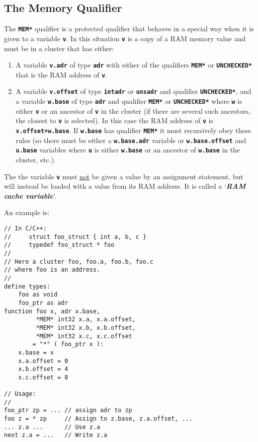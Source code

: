 \documentclass[12pt]{article}
\makeatletter
\newcommand{\TT}[1]{{\tt \bfseries #1}}
\newcommand{\key}[1]{{\bf \em #1}\index{#1}}
\newcommand{\ttkey}[1]{\TT{#1}\index{#1@{\tt #1}}}
\newenvironment{indpar}[1][0.3in]%
	{\begin{list}{}%
		     {\setlength{\itemsep}{0in}%
		      \setlength{\topsep}{0in}%
		      \setlength{\parsep}{1ex}%
		      \setlength{\labelwidth}{#1}%
		      \setlength{\leftmargin}{#1}%
		      \addtolength{\leftmargin}{\labelsep}}%
	 \item}%
	{\end{list}}
\makeatother
\begin{document}
\subsection{The Memory Qualifier}
\label{THE-MEM-QUALIFIER}

The \ttkey{*MEM*} qualifier is a protected qualifier that behaves
in a special way when it is given to a variable \TT{v}.
In this situation \TT{v} is a copy of a RAM memory value and
must be in a cluster that
has either:
\begin{enumerate}
\item
A variable \TT{v.adr} of type \TT{adr} with either of the qualifiers
\TT{*MEM*} or \TT{*UNCHECKED*} that is the RAM address of \TT{v}.

\item
A variable \TT{v.offset} of type \TT{intadr} or \TT{unsadr} and
qualifier \TT{*UNCHECKED*}, and
a variable \TT{w.base} of type \TT{adr} and qualifier \TT{*MEM*}
or \TT{*UNCHECKED*} where \TT{w} is either \TT{v} or an ancestor
of \TT{v} in the cluster (if there are several such ancestors, the
closest to \TT{v} is selected).
In this case the RAM address of \TT{v} is \TT{v.offset+w.base}.
If \TT{w.base} has qualifier \TT{*MEM*} it must recursively obey these
rules (so there must be either a \TT{w.base.adr} variable
or \TT{w.base.offset} and \TT{u.base} variables where \TT{u}
is either \TT{w.base} or an ancestor of \TT{w.base} in the cluster, etc.).
\end{enumerate}
The the
variable \TT{v} must \underline{not} be given a value by an
assignment statement, but will instead be loaded with a value
from its RAM address.  It is called a `\key{RAM cache variable}'.

An example is:

\begin{indpar}\begin{verbatim}
// In C/C++:
//     struct foo_struct { int a, b, c }
//     typedef foo_struct * foo
//
// Here a cluster foo, foo.a, foo.b, foo.c
// where foo is an address.
//
define types:
    foo as void
    foo_ptr as adr
function foo x, adr x.base,
         *MEM* int32 x.a, x.a.offset,
         *MEM* int32 x.b, x.b.offset,
         *MEM* int32 x.c, x.c.offset
        = "*" ( foo_ptr x ):
    x.base = x
    x.a.offset = 0
    x.b.offset = 4
    x.c.offset = 8

// Usage:
//
foo_ptr zp = ... // assign adr to zp
foo z = * zp     // Assign to z.base, z.a.offset, ...
... z.a ...      // Use z.a
next z.a = ...   // Write z.a

\end{verbatim}\end{indpar}
\end{document}
